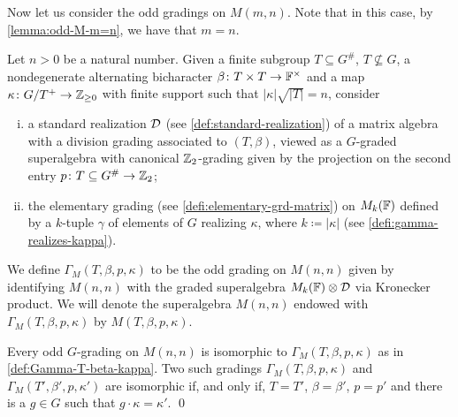 
Now let us consider the odd gradings on $M(m,n)$. 
Note that in this case, by \cref{lemma:odd-M-m=n}, we have that $m = n$. 


\begin{defi}\label{def:Gamma-T-beta-kappa-odd}
    Let $n > 0$ be a natural number. 
    Given a finite subgroup $T \subseteq G^\#$, $T\not\subseteq G$, a nondegenerate alternating bicharacter $\beta\colon T\times T \to \mathbb{F}^\times$ and a map $\kappa\colon G/T^+ \to \mathbb{Z}_{\geq 0}$ with finite support such that $|\kappa| \sqrt{|T|} = n$, consider 
    \begin{enumerate}[(i)]
        \item a standard realization $\mathcal{D}$ (see \cref{def:standard-realization}) of a matrix algebra with a division grading associated to $(T,\beta)$, viewed as a $G$-graded superalgebra with canonical $\mathbb{Z}_2$-grading given by the projection on the second entry $p\colon T \subseteq G^\# \to \mathbb{Z}_2$;
        \item the elementary grading (see \cref{defi:elementary-grd-matrix}) on $M_{k}(\mathbb{F})$ defined by a $k$-tuple $\gamma$ of elements of $G$ realizing $\kappa$, where $k \coloneqq |\kappa|$ (see \cref{defi:gamma-realizes-kappa}). 
    \end{enumerate}
    We define $\Gamma_M (T, \beta, p, \kappa)$ to be the odd grading on $M(n,n)$ given by identifying $M(n,n)$ with the graded superalgebra $M_k(\mathbb{F}) \otimes \mathcal{D}$ via Kronecker product.  
    We will denote the superalgebra $M(n,n)$ endowed with $\Gamma_M (T, \beta, p, \kappa)$ by $M (T, \beta, p, \kappa)$. 
\end{defi}

\begin{cor}\label{cor:iso-M-odd}
    Every odd $G$-grading on $M(n,n)$ is isomorphic to $\Gamma_M (T, \beta, p, \kappa)$ as in \cref{def:Gamma-T-beta-kappa}. 
    Two such gradings $\Gamma_M (T, \beta, p, \kappa)$ and $\Gamma_M (T', \beta', p, \kappa')$ are isomorphic if, and only if, $T = T'$, $\beta = \beta'$, $p = p'$ and there is a $g\in G$ such that $g\cdot \kappa = \kappa'$. \qed
\end{cor}


